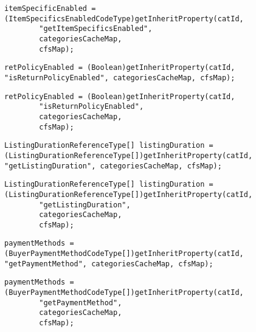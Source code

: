 \begin{lstlisting}[firstnumber=119, caption={Line 119 possible solution}]
itemSpecificEnabled = (ItemSpecificsEnabledCodeType)getInheritProperty(catId,
        "getItemSpecificsEnabled",
        categoriesCacheMap,
        cfsMap);
\end{lstlisting}
\noindent\makebox[\linewidth]{\rule{\linewidth}{0.4pt}}
\begin{lstlisting}[firstnumber=124, caption={Line 124 violation of the rule}]
retPolicyEnabled = (Boolean)getInheritProperty(catId, "isReturnPolicyEnabled", categoriesCacheMap, cfsMap);
\end{lstlisting}
\begin{lstlisting}[firstnumber=124, caption={Line 124 possible solution}]
retPolicyEnabled = (Boolean)getInheritProperty(catId,
        "isReturnPolicyEnabled",
        categoriesCacheMap,
        cfsMap);
\end{lstlisting}
\noindent\makebox[\linewidth]{\rule{\linewidth}{0.4pt}}
\begin{lstlisting}[firstnumber=138, caption={Line 138 violation of the rule}]
ListingDurationReferenceType[] listingDuration = (ListingDurationReferenceType[])getInheritProperty(catId, "getListingDuration", categoriesCacheMap, cfsMap);
\end{lstlisting}
\begin{lstlisting}[firstnumber=138, caption={Line 138 possible solution}]
ListingDurationReferenceType[] listingDuration = (ListingDurationReferenceType[])getInheritProperty(catId,
        "getListingDuration",
        categoriesCacheMap,
        cfsMap);
\end{lstlisting}
\noindent\makebox[\linewidth]{\rule{\linewidth}{0.4pt}}
\begin{lstlisting}[firstnumber=138, caption={Line 138 violation of the rule}]
paymentMethods = (BuyerPaymentMethodCodeType[])getInheritProperty(catId, "getPaymentMethod", categoriesCacheMap, cfsMap);
\end{lstlisting}
\begin{lstlisting}[firstnumber=138, caption={Line 138 possible solution}]
paymentMethods = (BuyerPaymentMethodCodeType[])getInheritProperty(catId,
        "getPaymentMethod",
        categoriesCacheMap,
        cfsMap);
\end{lstlisting}


